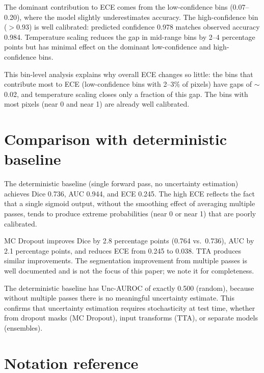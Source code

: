 The dominant contribution to ECE comes from the low-confidence bins
(0.07--0.20), where the model slightly underestimates accuracy. The
high-confidence bin ($> 0.93$) is well calibrated: predicted confidence
0.978 matches observed accuracy 0.984. Temperature scaling reduces the
gap in mid-range bins by 2--4 percentage points but has minimal effect
on the dominant low-confidence and high-confidence bins.

This bin-level analysis explains why overall ECE changes so little:
the bins that contribute most to ECE (low-confidence bins with 2--3\%
of pixels) have gaps of $\sim$0.02, and temperature scaling closes only
a fraction of this gap. The bins with most pixels (near 0 and near 1)
are already well calibrated.

\section{Comparison with deterministic baseline}
\label{app:deterministic}

The deterministic baseline (single forward pass, no uncertainty estimation)
achieves Dice 0.736, AUC 0.944, and ECE 0.245. The high ECE reflects the
fact that a single sigmoid output, without the smoothing effect of
averaging multiple passes, tends to produce extreme probabilities (near
0 or near 1) that are poorly calibrated.

MC Dropout improves Dice by 2.8 percentage points (0.764 vs.\ 0.736), AUC
by 2.1 percentage points, and reduces ECE from 0.245 to 0.038. TTA produces
similar improvements. The segmentation improvement from multiple passes is
well documented \citep{gal2016dropout} and is not the focus of this paper;
we note it for completeness.

The deterministic baseline has Unc-AUROC of exactly 0.500 (random), because
without multiple passes there is no meaningful uncertainty estimate. This
confirms that uncertainty estimation requires stochasticity at test time,
whether from dropout masks (MC Dropout), input transforms (TTA), or separate
models (ensembles).

\section{Notation reference}
\label{app:notation}

